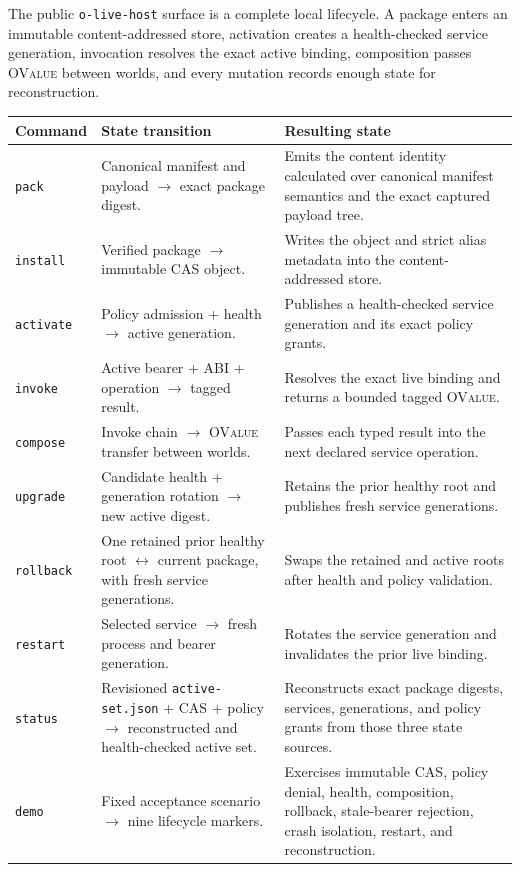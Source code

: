 \documentclass[11pt,oneside]{article}
\newcommand{\ovalue}{{\mdseries\textsc{OValue}}}
\begin{document}
The public \texttt{o-live-host} surface is a complete local lifecycle. A
package enters an immutable content-addressed store, activation creates a
health-checked service generation, invocation resolves the exact active
binding, composition passes \ovalue{} between worlds, and every mutation
records enough state for reconstruction.

\begin{longtable}{P{0.16\textwidth} P{0.34\textwidth} P{0.42\textwidth}}
\toprule
\textbf{Command} & \textbf{State transition} & \textbf{Resulting state} \\
\midrule
\endhead
\texttt{pack} & Canonical manifest and payload $\rightarrow$ exact package digest. &
Emits the content identity calculated over canonical manifest semantics and
the exact captured payload tree. \\
\texttt{install} & Verified package $\rightarrow$ immutable CAS object. &
Writes the object and strict alias metadata into the content-addressed store. \\
\texttt{activate} & Policy admission + health $\rightarrow$ active generation. &
Publishes a health-checked service generation and its exact policy grants. \\
\texttt{invoke} & Active bearer + ABI + operation $\rightarrow$ tagged result. &
Resolves the exact live binding and returns a bounded tagged \ovalue{}. \\
\texttt{compose} & Invoke chain $\rightarrow$ \ovalue{} transfer between worlds. &
Passes each typed result into the next declared service operation. \\
\texttt{upgrade} & Candidate health + generation rotation $\rightarrow$ new active digest. &
Retains the prior healthy root and publishes fresh service generations. \\
\texttt{rollback} & One retained prior healthy root $\leftrightarrow$ current
package, with fresh service generations. &
Swaps the retained and active roots after health and policy validation. \\
\texttt{restart} & Selected service $\rightarrow$ fresh process and bearer generation. &
Rotates the service generation and invalidates the prior live binding. \\
\texttt{status} & Revisioned \texttt{active-set.json} + CAS + policy
$\rightarrow$ reconstructed and health-checked active set. &
Reconstructs exact package digests, services, generations, and policy grants
from those three state sources. \\
\texttt{demo} & Fixed acceptance scenario $\rightarrow$ nine lifecycle markers. &
Exercises immutable CAS, policy denial, health, composition, rollback,
stale-bearer rejection, crash isolation, restart, and reconstruction. \\
\bottomrule
\end{longtable}
\end{document}
